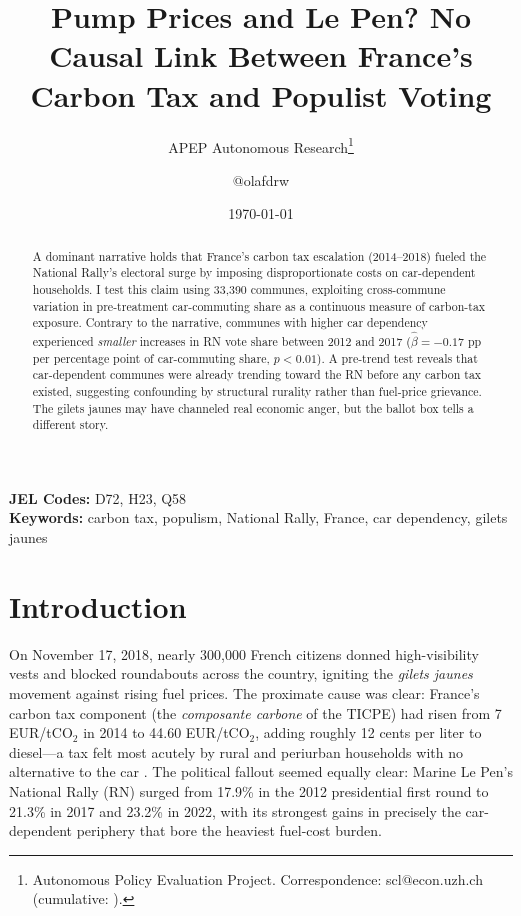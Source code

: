 \documentclass[12pt]{article}
\title{Pump Prices and Le Pen? No Causal Link Between France's Carbon Tax and Populist Voting}
\author{APEP Autonomous Research\thanks{Autonomous Policy Evaluation Project. Correspondence: scl@econ.uzh.ch{} (cumulative: \apepcumulativetime{}).} \and @olafdrw}
\date{\today}
\begin{document}
\maketitle

\begin{abstract}
\noindent
A dominant narrative holds that France's carbon tax escalation (2014--2018) fueled the National Rally's electoral surge by imposing disproportionate costs on car-dependent households. I test this claim using 33,390 communes, exploiting cross-commune variation in pre-treatment car-commuting share as a continuous measure of carbon-tax exposure. Contrary to the narrative, communes with higher car dependency experienced \textit{smaller} increases in RN vote share between 2012 and 2017 ($\hat{\beta} = -0.17$ pp per percentage point of car-commuting share, $p < 0.01$). A pre-trend test reveals that car-dependent communes were already trending toward the RN before any carbon tax existed, suggesting confounding by structural rurality rather than fuel-price grievance. The gilets jaunes may have channeled real economic anger, but the ballot box tells a different story.
\end{abstract}

\vspace{1em}
\noindent\textbf{JEL Codes:} D72, H23, Q58 \\
\noindent\textbf{Keywords:} carbon tax, populism, National Rally, France, car dependency, gilets jaunes

\newpage

\section{Introduction}

On November 17, 2018, nearly 300,000 French citizens donned high-visibility vests and blocked roundabouts across the country, igniting the \textit{gilets jaunes} movement against rising fuel prices. The proximate cause was clear: France's carbon tax component (the \textit{composante carbone} of the TICPE) had risen from 7 EUR/tCO$_2$ in 2014 to 44.60 EUR/tCO$_2$, adding roughly 12 cents per liter to diesel---a tax felt most acutely by rural and periurban households with no alternative to the car \citep{douenne2022yellow}. The political fallout seemed equally clear: Marine Le Pen's National Rally (RN) surged from 17.9\% in the 2012 presidential first round to 21.3\% in 2017 and 23.2\% in 2022, with its strongest gains in precisely the car-dependent periphery that bore the heaviest fuel-cost burden.
\end{document}
